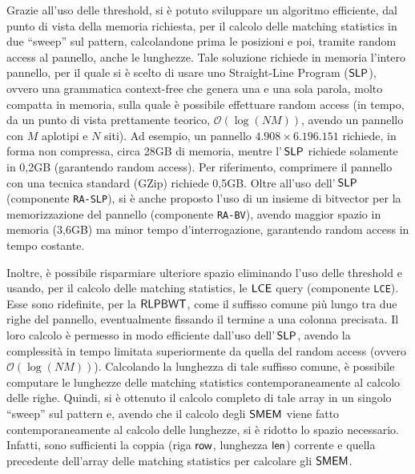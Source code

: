 \documentclass[a4paper,11pt, oneside,italian]{article}
\def\SLP{\mbox{\rm {\sf SLP}}}
\def\LCE{\mbox{\rm {\sf LCE}}}
\def\len{\mbox{\rm {\sf len}}}
\def\row{\mbox{\rm {\sf row}}}
\def\RLPBWT{\mbox{\rm {\sf RLPBWT}}}
\def\SMEM{\mbox{\rm {\sf SMEM}}}
\def\LCE{\mbox{\rm {\sf LCE}}}
\begin{document}
Grazie all'uso delle threshold, si è potuto sviluppare un algoritmo
efficiente, dal punto di vista della memoria richiesta, per il calcolo delle
matching statistics in due ``sweep'' sul pattern, calcolandone prima le
posizioni e poi, tramite random access al pannello, anche le
lunghezze. Tale soluzione richiede in memoria l'intero pannello, per il quale
si è scelto di usare uno Straight-Line Program ($\SLP$), ovvero una grammatica
context-free che genera una e una sola parola, molto compatta in memoria, sulla
quale è possibile effettuare random access (in tempo, da un punto di vista
prettamente teorico, $\mathcal{O}(\log (NM))$, avendo un pannello con $M$
aplotipi e $N$ siti).  
Ad esempio, un pannello  $4.908 \times 6.196.151$ richiede, in forma non
compressa, circa 28GB di memoria, mentre l'$\,\SLP$ 
richiede 
solamente in 0,2GB (garantendo random access). Per riferimento, comprimere il
pannello con una tecnica 
standard (GZip) richiede 0,5GB. Oltre all'uso dell'$\,\SLP$ (componente
\texttt{RA-SLP}), si è anche proposto l'uso di un insieme di bitvector per la
memorizzazione 
del pannello (componente \texttt{RA-BV}), avendo maggior spazio in memoria
(3,6GB) ma minor tempo d'interrogazione, garantendo random access in tempo
costante.  

Inoltre, è possibile risparmiare ulteriore spazio eliminando
l'uso delle threshold e usando, per il calcolo delle matching
statistics, le $\LCE$ query (componente \texttt{LCE}). Esse sono
ridefinite, per la $\RLPBWT$, come il suffisso comune più lungo tra due righe
del pannello, eventualmente 
fissando il termine a una colonna precisata. Il loro calcolo è permesso
in modo efficiente dall'uso dell'$\,\SLP$, avendo la complessità in tempo
limitata superiormente da quella del random access (ovvero $\mathcal{O}(\log
(NM))$). Calcolando la 
lunghezza di tale suffisso comune, è possibile computare le
lunghezze delle matching statistics contemporaneamente al calcolo delle
righe. Quindi, si è ottenuto il calcolo completo di tale array in
un singolo ``sweep'' sul pattern e, avendo che il calcolo degli $\SMEM$ viene
fatto 
contemporaneamente al calcolo delle lunghezze, si è ridotto lo spazio
necessario. Infatti, sono sufficienti la 
coppia (riga $\row$, lunghezza $\len$) corrente e quella precedente dell'array
delle matching statistics per calcolare gli $\SMEM$.
\end{document}
